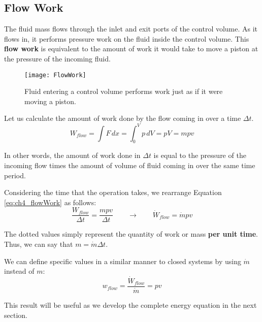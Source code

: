 
\subsection{Flow Work}

The fluid mass flows through the inlet and exit ports of the control volume.  As it flows in, it performs pressure work on the fluid inside the control volume.  This {\bf flow work} is equivalent to the amount of work it would take to move a piston at the pressure of the incoming fluid.

\begin{figure}[H]
\centering
\texttt{[image: FlowWork]}
\caption{Fluid entering a control volume performs work just as if it were moving a piston.}
\label{fig:ch3_flowWork}
\end{figure}

Let us calculate the amount of work done by the flow coming in over a time $\Delta t$.
\begin{equation} \label{eq:ch4_flowWork}
  W_{flow} = \int F\,dx = \int_0^V p\, dV = pV = mpv
\end{equation}

In other words, the amount of work done in $\Delta t$ is equal to the pressure of the incoming flow times the amount of volume of fluid coming in over the same time period.

Considering the time that the operation takes, we rearrange Equation \ref{eq:ch4_flowWork} as follows:
\begin{equation*}
  \frac{W_{flow}}{\Delta t} = \frac{mpv}{\Delta t} \qquad \rightarrow \qquad
  \dot{W}_{flow} = \dot{m}pv
\end{equation*}

The dotted values simply represent the quantity of work or mass {\bf per unit time}.  Thus, we can say that $m = \dot{m}\Delta t$.

We can define specific values in a similar manner to closed systems by using $\dot{m}$ instead of $m$:
\begin{equation} \label{eq:ch4_specificFlowWork}
  w_{flow} = \frac{\dot{W}_{flow}}{\dot{m}} = pv
\end{equation}

This result will be useful as we develop the complete energy equation in the next section.

